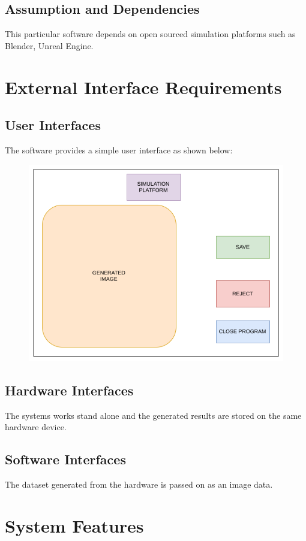 \documentclass[a4paper,12pt]{article}
\begin{document}
\subsection{Assumption and Dependencies}
This particular software depends on open sourced simulation platforms such as Blender, Unreal Engine.
\newpage
\section{External Interface Requirements}
\subsection{User Interfaces}
The software provides a simple user interface as shown below:
\begin{figure}[H]
\includegraphics[scale=0.75]{gui.png}
\end{figure}
\subsection{Hardware Interfaces}
The systems works stand alone and the generated results are stored on the same hardware device.
\subsection{Software Interfaces}
The dataset generated from the hardware is passed on as an image data. 

\newpage
\section{System Features}
\end{document}
